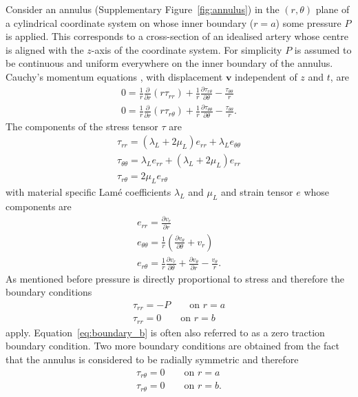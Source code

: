 \documentclass{frontiers_suppmat} %
\newcommand{\dd}{\partial}
\newcommand{\disp}{\boldsymbol{v}}
\newcommand{\taurr}{\tau_{rr}}
\newcommand{\taurt}{\tau_{r\theta}}
\newcommand{\tautt}{\tau_{\theta\theta}}
\newcommand{\err}{e_{rr}}
\newcommand{\ert}{e_{r\theta}}
\newcommand{\ett}{e_{\theta\theta}}
\begin{document}
Consider an annulus (Supplementary Figure~\ref{fig:annulus}) in the $(r, \theta)$ plane of a cylindrical coordinate system on whose inner boundary ($r = a$) some pressure $P$ is applied. This corresponds to a cross-section of an idealised artery whose centre is aligned with the $z$-axis of the coordinate system. For simplicity $P$ is assumed to be continuous and uniform everywhere on the inner boundary of the annulus. Cauchy's momentum equations \cite{Howell2008}, with displacement $\disp$ independent of $z$ and $t$, are
\begin{gather}
0 = \frac{1}{r} \frac{\dd}{\dd r} \left( r \taurr \right) + \frac{1}{r} \frac{\dd \taurt}{\dd \theta} - \frac{\tautt}{r}\label{eq:cauchy1}\\
0 = \frac{1}{r} \frac{\dd}{\dd r} \left( r \taurt \right) + \frac{1}{r} \frac{\dd \tautt}{\dd \theta} - \frac{\tautt}{r}.\label{eq:cauchy2}
\end{gather}
The components of the stress tensor $\tau$ are
\begin{gather}
\taurr = (\lambda_L + 2\mu_L) \err + \lambda_L \ett \label{eq:taurr}\\
\tautt = \lambda_L \err + (\lambda_L + 2\mu_L) \err \label{eq:tautt}\\
\taurt = 2\mu_L \ert \label{eq:taurt}
\end{gather}
with material specific Lam\'e coefficients $\lambda_L$ and $\mu_L$ and strain tensor $e$ whose components are
\begin{gather}
\err = \frac{\dd v_r}{\dd r}\\
\ett = \frac{1}{r} \left( \frac{\dd v_{\theta}}{\dd \theta} + v_r \right)\\
\ert = \frac{1}{r} \frac{\dd v_r}{\dd \theta} + \frac{\dd v_{\theta}}{\dd r} - \frac{v_{\theta}}{r}.
\end{gather}
As mentioned before pressure is directly proportional to stress and therefore the boundary conditions
\begin{gather}
\taurr = -P \qquad \text{on } r = a\label{eq:boundary_p}\\
\taurr = 0 \qquad \text{on } r = b\label{eq:boundary_b}
\end{gather}
apply. Equation~\ref{eq:boundary_b} is often also referred to as a zero traction boundary condition. Two more boundary conditions are obtained from the fact that the annulus is considered to be radially symmetric and therefore
\begin{gather}
\taurt = 0 \qquad \text{on } r = a\label{eq:boundary_a}\\
\taurt = 0 \qquad \text{on } r = b.\label{eq:boundary_rtb}
\end{gather}
\end{document}
